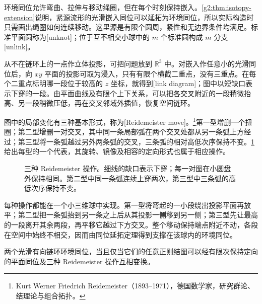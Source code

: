 \ProseParagraphBreak

环境同位允许弯曲、拉伸与移动绳圈，但在每个时刻保持嵌入。\cref{g2:thm:isotopy-extension}说明，紧源流形的光滑嵌入同位可以延拓为环境同位，所以实际构造时只需画出绳圈如何连续移动。这里源是有限个圆周，紧性和无边界条件均满足。标准平面圆称为[unknot]；位于互不相交小球中的 \(m\) 个标准圆构成 \(m\) 分支[unlink]。

\ProseParagraphBreak

从不在链环上的一点作立体投影，可把问题放到 \(\mathbb R^3\) 中。对嵌入作任意小的光滑同位后，向 \(xy\) 平面的投影可取为浸入，只有有限个横截二重点，没有三重点。在每个二重点标明哪一段位于较高的 \(z\) 坐标，就得到[link diagram]；图中以短缺口表示下穿的一段。由平面曲线及有限个上下关系，可以把各交叉附近的一段稍微抬高、另一段稍微压低，再在交叉邻域外插值，恢复空间链环。

\ProseParagraphBreak

图中的局部变化有三种基本形式，称为[Reidemeister move]。\footnote{Kurt Werner Friedrich Reidemeister（1893--1971），德国数学家，研究群论、结理论与组合拓扑。}第一型增删一个扭圈；第二型增删一对交叉，其中同一条局部弧在两个交叉处都从另一条弧上方经过；第三型将一条弧越过另外两条弧的交叉，三条弧的相对高低次序保持不变。\cref{g2:fig:reidemeister-moves}给出每型的一个代表，其旋转、镜像及相容的定向形式也属于相应操作。

\begin{figure}[htbp]
	\centering
	
	\caption[三种 Reidemeister 操作]{三种 Reidemeister 操作。细线的缺口表示下穿；每一对图在小圆盘外保持相同。第二型中同一条弧连续上穿两次，第三型中三条弧的高低次序保持不变。}
	\label{g2:fig:reidemeister-moves}
\end{figure}

每种操作都能在一个小三维球中实现。第一型将弯起的一小段绕出投影平面再放平；第二型把一条弧抬到另一条之上后从其投影一侧移到另一侧；第三型先让最高的一段离开其余两段，再平移它越过下方交叉。整个移动保持端点附近不动，各段在空间中始终不相交，因而由同位延拓定理得到支撑在该球内的环境同位。

\begin{theorem}[Reidemeister 定理]\label{g2:thm:reidemeister}
	两个光滑有向链环环境同位，当且仅当它们的任意正则结图可以经有限次保持定向的平面同位及三种 Reidemeister 操作互相变换。
\end{theorem}

